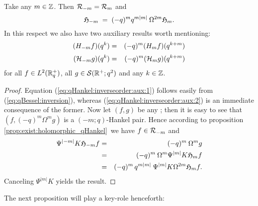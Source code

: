 \begin{prop} \label{prop:qHankel:inverseorder}
Take any\/ $m\in\mathbb{Z}$. Then\/ ${\mathcal R}_{-m} = {\mathcal R}_{m}$ and
$$\mathfrak{H}_{-m}  \;=\;  (-q)^m q^{m|m|} \:\Omega^{2m} \mathfrak{H}_{m}. $$
In this respect we also have two auxiliary results worth mentioning:
\begin{eqnarray}
  (H_{-m} f)(q^k)     &=&  (-q)^m (H_m f)(q^{k+m})
\label{eq:qHankel:inverseorder:aux:1}
\\ \vertL
  (\auxH{-m} g)(q^k)  &=&  (-q)^m (\auxH{m} g)(q^{k+m})
\label{eq:qHankel:inverseorder:aux:2}
\end{eqnarray}
for all\/ $f\in L^2(\mathbb{R}_q^+)$, all\/ $g\in {\mathcal S}(\mathbb{R}^+;q^2)$ and any\/ $k\in\mathbb{Z}$.
\end{prop}

\begin{proof}
Equation (\ref{eq:qHankel:inverseorder:aux:1}) follows easily from
(\ref{eq:qBessel:inversion}), whereas (\ref{eq:qHankel:inverseorder:aux:2}) is an
immediate consequence of the former.
Now let $(f,g)$ be any \Hmpair\@; then it is easy to see that
$(f, (-q)^m \Omega^m g)$ is a \mbox{$(-m;q)$-Hankel} pair.
Hence according to proposition \ref{prop:exist:holomorphic_qHankel}\
we have $f\in {\mathcal R}_{-m}$ and
\begin{eqnarray*}
   \Psi^{|-m|} K \mathfrak{H}_{-m}f
  &=&
   (-q)^m \: \Omega^m g
\\&=&
   (-q)^m \:\Omega^m \Psi^{|m|} K \mathfrak{H}_{m}f
\\&=&
   (-q)^m \, q^{m|m|} \: \Psi^{|m|} K \Omega^{2m} \mathfrak{H}_{m} f.
\end{eqnarray*}
Canceling $\Psi^{|m|} K$ yields the result.
\end{proof}
\vspace{2ex}

The next proposition will play a key-role henceforth:

